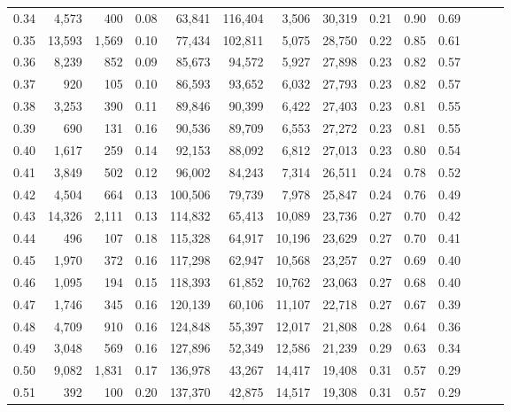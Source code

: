 \begin{tabular}{rrrrrrrrrrrrrr}
0.34 &   4,573 &    400 &  0.08 &   63,841 &  116,404 &   3,506 &  30,319 &  0.21 &  0.90 &      0.69 \\
0.35 &  13,593 &  1,569 &  0.10 &   77,434 &  102,811 &   5,075 &  28,750 &  0.22 &  0.85 &      0.61 \\
0.36 &   8,239 &    852 &  0.09 &   85,673 &   94,572 &   5,927 &  27,898 &  0.23 &  0.82 &      0.57 \\
0.37 &     920 &    105 &  0.10 &   86,593 &   93,652 &   6,032 &  27,793 &  0.23 &  0.82 &      0.57 \\
0.38 &   3,253 &    390 &  0.11 &   89,846 &   90,399 &   6,422 &  27,403 &  0.23 &  0.81 &      0.55 \\
0.39 &     690 &    131 &  0.16 &   90,536 &   89,709 &   6,553 &  27,272 &  0.23 &  0.81 &      0.55 \\
0.40 &   1,617 &    259 &  0.14 &   92,153 &   88,092 &   6,812 &  27,013 &  0.23 &  0.80 &      0.54 \\
0.41 &   3,849 &    502 &  0.12 &   96,002 &   84,243 &   7,314 &  26,511 &  0.24 &  0.78 &      0.52 \\
0.42 &   4,504 &    664 &  0.13 &  100,506 &   79,739 &   7,978 &  25,847 &  0.24 &  0.76 &      0.49 \\
0.43 &  14,326 &  2,111 &  0.13 &  114,832 &   65,413 &  10,089 &  23,736 &  0.27 &  0.70 &      0.42 \\
0.44 &     496 &    107 &  0.18 &  115,328 &   64,917 &  10,196 &  23,629 &  0.27 &  0.70 &      0.41 \\
0.45 &   1,970 &    372 &  0.16 &  117,298 &   62,947 &  10,568 &  23,257 &  0.27 &  0.69 &      0.40 \\
0.46 &   1,095 &    194 &  0.15 &  118,393 &   61,852 &  10,762 &  23,063 &  0.27 &  0.68 &      0.40 \\
0.47 &   1,746 &    345 &  0.16 &  120,139 &   60,106 &  11,107 &  22,718 &  0.27 &  0.67 &      0.39 \\
0.48 &   4,709 &    910 &  0.16 &  124,848 &   55,397 &  12,017 &  21,808 &  0.28 &  0.64 &      0.36 \\
0.49 &   3,048 &    569 &  0.16 &  127,896 &   52,349 &  12,586 &  21,239 &  0.29 &  0.63 &      0.34 \\
0.50 &   9,082 &  1,831 &  0.17 &  136,978 &   43,267 &  14,417 &  19,408 &  0.31 &  0.57 &      0.29 \\
0.51 &     392 &    100 &  0.20 &  137,370 &   42,875 &  14,517 &  19,308 &  0.31 &  0.57 &      0.29 \\

\end{tabular}

